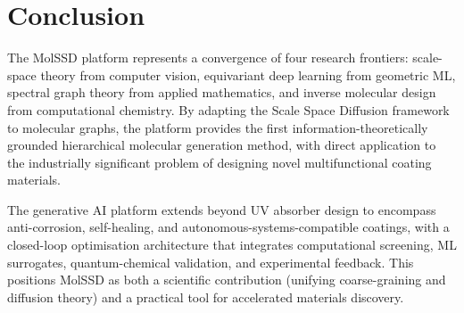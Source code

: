 \documentclass[11pt,a4paper]{article}
\begin{document}
\section{Conclusion}

The MolSSD platform represents a convergence of four research frontiers:
scale-space theory from computer vision, equivariant deep learning from
geometric ML, spectral graph theory from applied mathematics, and
inverse molecular design from computational chemistry. By adapting the
Scale Space Diffusion framework to molecular graphs, the platform provides
the first information-theoretically grounded hierarchical molecular
generation method, with direct application to the industrially significant
problem of designing novel multifunctional coating materials.

The generative AI platform extends beyond UV absorber design to encompass
anti-corrosion, self-healing, and autonomous-systems-compatible coatings,
with a closed-loop optimisation architecture that integrates computational
screening, ML surrogates, quantum-chemical validation, and experimental
feedback. This positions MolSSD as both a scientific contribution
(unifying coarse-graining and diffusion theory) and a practical tool for
accelerated materials discovery.
\end{document}
